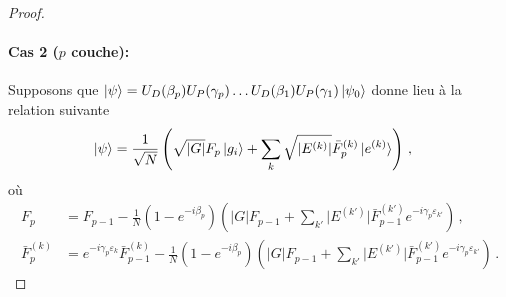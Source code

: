 \begin{proof}
\paragraph{Cas 2 ($p$ couche):} Supposons que $\ket{\psi} = U_{D}(\beta_{p}) U_{P}(\gamma_{p}) \dots U_{D}(\beta_{1})U_{P}(\gamma_{1})\ket{\psi_{0}}$ donne lieu à la relation suivante
\begin{equation}
\begin{aligned}
    \ket{\psi} &= \frac{1}{\sqrt{ N }} \left( \sqrt{ \lvert G \rvert } F_{p} \ket{g_{i}} + \sum_{k} \sqrt{ \lvert E^{(k)} \rvert } \bar{F}^{(k)}_{p} \ket{e^{(k)}} \right) \,,
\end{aligned}
\end{equation}
où
\begin{equation}
\begin{aligned}
    F_{p} &= F_{p-1} - \frac{1}{N} (1-e^{-i\beta_{p}}) \left( \lvert G \rvert   F_{p-1} + \sum_{k'} \lvert E^{(k')} \rvert \bar{F}^{(k')}_{p-1} e^{-i\gamma_{p}\varepsilon_{k'}} \right) \,, \\
    \bar{F}^{(k)}_{p} &= e^{-i\gamma_{p} \varepsilon_{k}}\bar{F}_{p-1}^{(k)} - \frac{1}{N} (1-e^{-i\beta_{p}}) \left( \lvert G \rvert   F_{p-1} + \sum_{k'} \lvert E^{(k')} \rvert \bar{F}^{(k')}_{p-1} e^{-i\gamma_{p}\varepsilon_{k'}} \right) \,.
\end{aligned}
\end{equation}


\end{proof}
